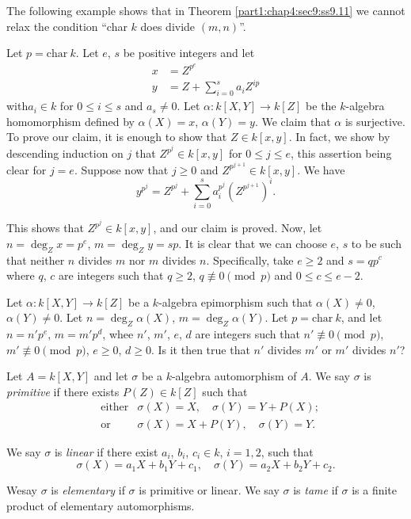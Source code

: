 The following example shows that in Theorem \ref{part1:chap4:sec9:ss9.11} we cannot relax the condition ``char $k$ does divide \gcd $(m, n)$''.

\setcounter{thm}{11}
\begin{example}\label{part1:chap4:sec9:exp9.12}
  Let $p = \text{char}~ k$. Let $e$, $s$ be positive integers and let
\begin{align*}
  x & = Z^{p^e}\\
  y & = Z+ \sum^s_{i=0} a_i Z^{ip}
\end{align*}
with\pageoriginale $a_i \in k$ for $0 \leq i \leq s$ and $a_s \neq 0$. Let $\alpha : k [X, Y] \to k[Z]$ be the $k$-algebra homomorphism defined by $\alpha (X)= x$, $\alpha(Y)=y$. We claim that $\alpha$ is surjective. To prove our claim, it is enough to show that $Z \in k [x, y]$. In fact, we show by descending induction on $j$ that $Z^{p^j} \in k[x, y]$ for $0 \leq j \leq e$, this assertion being clear for $j=e$. Suppose now that $j \geq 0$ and $Z^{p^{j+1}} \in k [x, y]$. We have
$$
y^{p^j} = Z^{p^j}+ \sum^s_{i=0} a_i^{p^j} (Z^{p^{j+1}})^i.
$$
\end{example}

This shows that $Z^{p^j} \in k[x, y]$, and our claim is proved. Now, let $n= \deg_Z x= p^e$, $m= \deg_Z y= sp$. It is clear that we can choose $e$, $s$ to be such that neither $n$ divides $m$ nor $m$ divides $n$. Specifically, take $e\geq 2$ and $s= qp^c$ where $q$, $c$ are integers such that $q \geq 2$, $q \not\equiv 0 \pmod{p}$ and $0 \leq c \leq e-2$.

\begin{qun}\label{part1:chap4:sec9:qun9.13}
  Let $\alpha : k[X, Y] \to k[Z]$ be a $k$-algebra epimorphism such that $\alpha(X) \neq 0$, $\alpha (Y)\neq 0$. Let $n= \deg_Z \alpha(X)$, $m= \deg_Z \alpha(Y)$. Let $p = \text{char}~ k$, and let $n= n' p^e$, $m=m' p^d$, whee $n'$, $m'$, $e$, $d$ are integers such that $n'\nequiv 0 \pmod{p}$, $m' \nequiv 0 \pmod{p}$, $e \geq 0$, $d \geq 0$. Is it then true that $n'$ divides $m'$ or $m'$ divides $n'$?
\end{qun}

\begin{defi}\label{part1:chap4:sec9:def9.14}
  Let $A = k[X, Y]$ and let $\sigma$ be a $k$-algebra automorphism of $A$. We say $\sigma$ is {\em primitive} if there exists $P(Z) \in k[Z]$ such that 
\begin{align*}
  & \text{either} & \sigma (X) = X, \quad \sigma (Y) = Y + P(X);\\
  & \text{or} & \sigma(X) = X+ P(Y), \quad \sigma(Y)=Y.
\end{align*}

We say $\sigma$ is {\em linear} if there exist $a_i$, $b_i$, $c_i \in k$, $i=1,2$, such that
$$
\sigma (X) = a_1 X + b_1 Y + c_1, \quad \sigma (Y) = a_2 X + b_2 Y + c_2.
$$

We\pageoriginale say $\sigma$ is {\em elementary} if $\sigma$ is primitive or linear. We say $\sigma$ is {\em tame} if $\sigma$ is a finite product of elementary automorphisms.
\end{defi}

